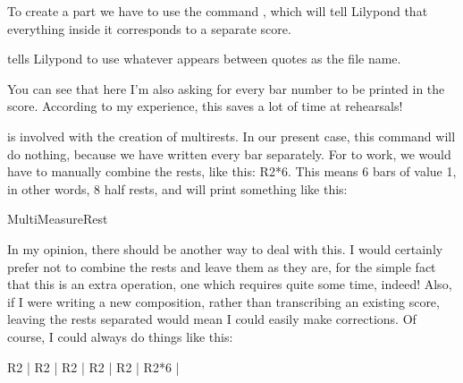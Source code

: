 \documentclass[../../LilyPond-Tutorials]{subfiles}
\begin{document}
To create a part we have to use the command , which will tell Lilypond that everything inside it corresponds to a separate score.

\begin{lilypondcode}
\end{lilypondcode}

 tells Lilypond to use whatever appears between quotes as the file name.

You can see that here I'm also asking for every bar number to be printed in the score.
According to my experience, this saves a lot of time at rehearsals!

 is involved with the creation of multirests.
In our present case, this command will do nothing, because we have written every bar separately.
For  to work, we would have to manually combine the rests, like this: R2*6.
This means 6 bars of value 1, in other words, 8 half rests, and will print something like this:

\begin{musicExample}
\caption{MultiMeasureRest}
\label{xmp:multi-measure-rest}
\end{musicExample}

In my opinion, there should be another way to deal with this.
I would certainly prefer not to combine the rests and leave them as they are, for the simple fact that this is an extra operation, one which requires quite some time, indeed!
Also, if I were writing a new composition, rather than transcribing an existing score, leaving the rests separated would mean I could easily make corrections.
Of course, I could always do things like this:

\begin{lilypondcode}
R2 | %
R2 | %
R2 | %
R2 | %
R2 | %
R2*6 | %
\end{lilypondcode}
\end{document}

